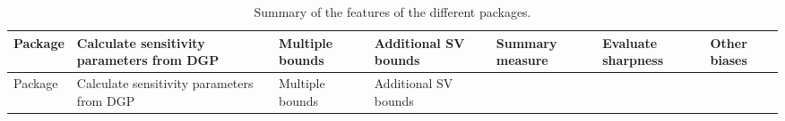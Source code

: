 \begin{longtable}[]{@{}
  >{\centering\arraybackslash}p{}
  >{\centering\arraybackslash}p{}
  >{\centering\arraybackslash}p{}
  >{\centering\arraybackslash}p{}
  >{\centering\arraybackslash}p{}
  >{\centering\arraybackslash}p{}
  >{\centering\arraybackslash}p{}@{}}
\caption{\label{tab:packages} Summary of the features of the different packages.}\tabularnewline
\toprule\noalign{}
\begin{minipage}[b]{\linewidth}\centering
Package
\end{minipage} & \begin{minipage}[b]{\linewidth}\centering
Calculate sensitivity parameters from DGP
\end{minipage} & \begin{minipage}[b]{\linewidth}\centering
Multiple bounds
\end{minipage} & \begin{minipage}[b]{\linewidth}\centering
Additional SV bounds
\end{minipage} & \begin{minipage}[b]{\linewidth}\centering
Summary measure
\end{minipage} & \begin{minipage}[b]{\linewidth}\centering
Evaluate sharpness
\end{minipage} & \begin{minipage}[b]{\linewidth}\centering
Other biases
\end{minipage} \\
\midrule\noalign{}
\endfirsthead
\toprule\noalign{}
\begin{minipage}[b]{\linewidth}\centering
Package
\end{minipage} & \begin{minipage}[b]{\linewidth}\centering
Calculate sensitivity parameters from DGP
\end{minipage} & \begin{minipage}[b]{\linewidth}\centering
Multiple bounds
\end{minipage} & \begin{minipage}[b]{\linewidth}\centering
Additional SV bounds
\end{minipage} & \begin{minipage}[b]{\linewidth}\centering

\end{minipage}
\end{longtable}
